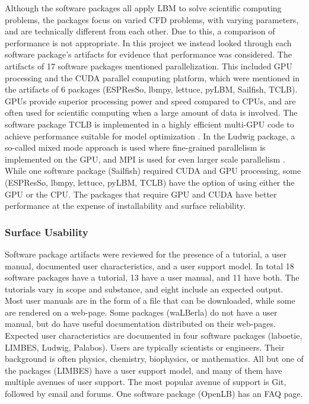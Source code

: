 \documentclass[12pt, notitlepage]{article}
\begin{document}
Although the software packages all apply LBM to solve scientific computing problems, the packages focus on varied CFD problems, with varying parameters, and are technically different from each other. Due to this, a comparison of performance is not appropriate. In this project we instead looked through each software package's artifacts for evidence that performance was considered. The artifacts of 17 software packages mentioned parallelization. This included GPU processing and the CUDA parallel computing platform, which were mentioned in the artifacts of 6 packages (ESPResSo, lbmpy, lettuce, pyLBM, Sailfish, TCLB). GPUs provide superior processing power and speed compared to CPUs, and are often used for scientific computing when a large amount of data is involved. The software package TCLB is implemented in a highly efficient multi-GPU code to achieve performance suitable for model optimization \citep{rutkowski2020open}. In the Ludwig package, a so-called mixed mode approach is used where fine-grained parallelism is implemented on the GPU, and MPI is used for even larger scale parallelism \citep{gray2013ludwig}. While one software package (Sailfish) required CUDA and GPU processing, some (ESPResSo, lbmpy, lettuce, pyLBM, TCLB) have the option of using either the GPU or the CPU. The packages that require GPU and CUDA have better performance at the expense of installability and surface reliability.

\subsubsection{Surface Usability}

Software package artifacts were reviewed for the presence of a tutorial, a user manual, documented user characteristics, and a user support model. In total 18 software packages have a tutorial, 13 have a user manual, and 11 have both. The tutorials vary in scope and substance, and eight include an expected output. Most user manuals are in the form of a file that can be downloaded, while some are rendered on a web-page. Some packages (waLBerla) do not have a user manual, but do have useful documentation distributed on their web-pages. Expected user characteristics are documented in four software packages (laboetie, LIMBES, Ludwig, Palabos). Users are typically scientists or engineers. Their background is often physics, chemistry, biophysics, or mathematics. All but one of the packages (LIMBES) have a user support model, and many of them have multiple avenues of user support. The most popular avenue of support is Git, followed by email and forums. One software package (OpenLB) has an FAQ page.    
\end{document}

